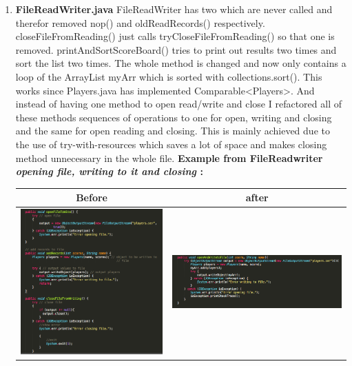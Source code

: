 \documentclass{article}
\begin{document}
\begin{enumerate}
	\item
	\textbf{FileReadWriter.java}
	FileReadWriter has two which are never called and therefor removed nop() and oldReadRecords()
	respectively.
	closeFileFromReading() just calls tryCloseFileFromReading() so that one is removed.
	printAndSortScoreBoard() tries to print out results two times and sort the list two times.
	The whole method is changed and now only contains a loop of the ArrayList myArr which is sorted
	with collections.sort(). This works since Players.java has implemented Comparable<Players>.
	And instead of having one method to open read/write and close I refactored all of these methods
	sequences of operations to one for open, writing and closing and the same for open reading and closing. This is mainly achieved due to the use of try-with-resources which saves a lot of space and
	makes closing method unnecessary in the whole file. 
	\textbf{Example from FileReadwriter \textit{opening file, writing to it and closing} :\newline}
	\hspace*{-1.5cm}
	\begin{tabulary}{0.5\textwidth}{| c | c |}
	 \hline
	 Before & after \\ \hline
	\includegraphics[scale=0.4]{FileReadWriter-EXAMPLE-BEFORE.png} & \includegraphics[scale=0.4]{FileReaderWriter-EXAMPLE-AFTER.png} \\ \hline
	\end{tabulary}


\end{enumerate}
\end{document}
